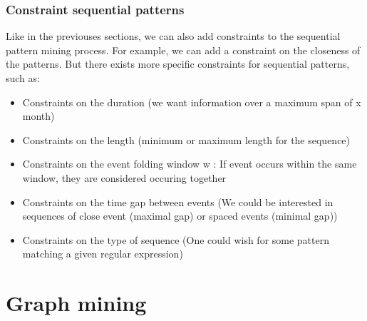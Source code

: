 \documentclass[12pt, openany]{report}
\theoremstyle{definition}
\begin{document}
\subsection{Constraint sequential patterns}
Like in the previouses sections, we can also add constraints to the sequential pattern mining process. For example, we can add a constraint on the closeness of the patterns. But there exists more specific constraints for sequential patterns, such as:
\begin{itemize}
    \item Constraints on the duration (we want information over a maximum span of x month)
    \item Constraints on the length (minimum or maximum length for the sequence)
    \item Constraints on the event folding window w : If event occurs within the same window, they are considered occuring together
    \item Constraints on the time gap between events (We could be interested in sequences of close event (maximal gap) or spaced events (minimal gap))
    \item Constraints on the type of sequence (One could wish for some pattern matching a given regular expression)
\end{itemize}
\chapter{Graph mining}
\end{document}
